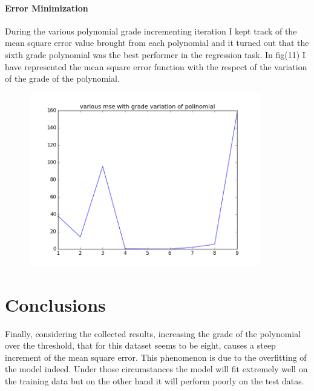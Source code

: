 \documentclass{article}
\begin{document}
				\subsection{Error Minimization}
				During the various polynomial grade incrementing iteration I kept track of the mean square error value brought from each polynomial and it turned out that the sixth grade polynomial was the best performer in the regression task.
				In fig(11) I have represented the mean square error function with the respect of the variation of the grade of the polynomial.
									\begin{center}
\begin{figure}
\centering
\includegraphics[width=0.9\textwidth]{grade-polivariation-mse}
\caption{}
\label{fig:7}
\end{figure}
\end{center}



\newpage
			\part{Conclusions}
				
			Finally, considering the collected results,  increasing the grade of the polynomial over the threshold, that for this dataset seems to be eight, causes a steep increment of the mean square error. This phenomenon is due to the overfitting of the model indeed. Under those circumstances the model will fit extremely well on the training data but on the other hand it will perform poorly on the test datas.
			
		
\end{document}
